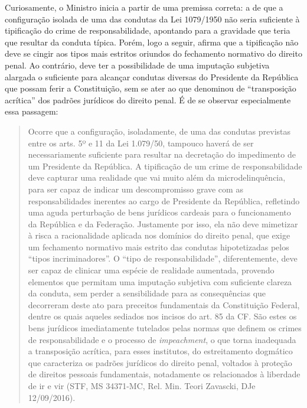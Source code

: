 Curiosamente, o Ministro inicia a partir de uma premissa correta: a de
que a configuração isolada de uma das condutas da Lei 1079/1950 não
seria suficiente à tipificação do crime de responsabilidade, apontando
para a gravidade que teria que resultar da conduta típica. Porém, logo a
seguir, afirma que a tipificação não deve se cingir aos tipos mais
estritos oriundos do fechamento normativo do direito penal. Ao
contrário, deve ter a possibilidade de uma imputação subjetiva alargada
o suficiente para alcançar condutas diversas do Presidente da República
que possam ferir a Constituição, sem se ater ao que denominou de
``transposição acrítica'' dos padrões jurídicos do direito penal. É de
se observar especialmente essa passagem:

\begin{quote}
Ocorre que a configuração, isoladamente, de uma das condutas previstas
entre os arts. 5º e 11 da Lei 1.079/50, tampouco haverá de ser
necessariamente suficiente para resultar na decretação do impedimento de
um Presidente da República. A tipificação de um crime de
responsabilidade deve capturar uma realidade que vai muito além da
microdelinquência, para ser capaz de indicar um descompromisso grave com
as responsabilidades inerentes ao cargo de Presidente da República,
refletindo uma aguda perturbação de bens jurídicos cardeais para o
funcionamento da República e da Federação. Justamente por isso, ela não
deve mimetizar à risca a racionalidade aplicada nos domínios do direito
penal, que exige um fechamento normativo mais estrito das condutas
hipotetizadas pelos ``tipos incriminadores''. O ``tipo de
responsabilidade'', diferentemente, deve ser capaz de clinicar uma
espécie de realidade aumentada, provendo elementos que permitam uma
imputação subjetiva com suficiente clareza da conduta, sem perder a
sensibilidade para as consequências que decorreram deste ato para
preceitos fundamentais da Constituição Federal, dentre os quais aqueles
sediados nos incisos do art. 85 da CF. São estes os bens jurídicos
imediatamente tutelados pelas normas que definem os crimes de
responsabilidade e o processo de \emph{impeachment}, o que torna
inadequada a transposição acrítica, para esses institutos, do
estreitamento dogmático que caracteriza os padrões jurídicos do direito
penal, voltados à proteção de direitos pessoais fundamentais,
notadamente os relacionados à liberdade de ir e vir (STF, MS 34371-MC,
Rel. Min. Teori Zavascki, DJe 12/09/2016).
\end{quote}

